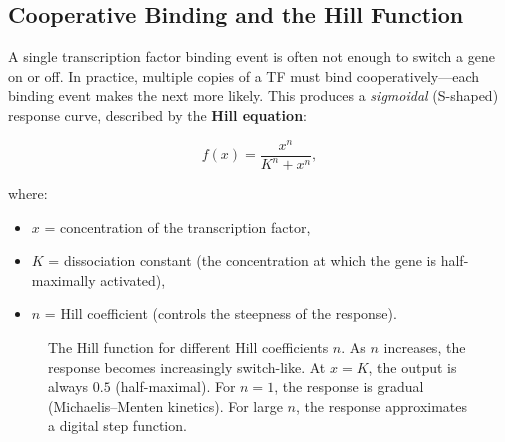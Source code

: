\subsection{Cooperative Binding and the Hill Function}
\label{subsec:hill-function}

A single transcription factor binding event is often not enough to switch a gene on or off. In practice, multiple copies of a TF must bind cooperatively---each binding event makes the next more likely. This produces a \emph{sigmoidal} (S-shaped) response curve, described by the \textbf{Hill equation}:

\begin{equation}
f(x) = \frac{x^n}{K^n + x^n},
\label{eq:hill-equation}
\end{equation}

where:
\begin{itemize}[leftmargin=1.8em]
  \item $x$ = concentration of the transcription factor,
  \item $K$ = dissociation constant (the concentration at which the gene is half-maximally activated),
  \item $n$ = Hill coefficient (controls the steepness of the response).
\end{itemize}

\begin{figure}[H]
\centering
{}
\caption{The Hill function for different Hill coefficients $n$. As $n$ increases, the response becomes increasingly switch-like. At $x=K$, the output is always $0.5$ (half-maximal). For $n=1$, the response is gradual (Michaelis--Menten kinetics). For large $n$, the response approximates a digital step function.}
\label{fig:hill-function}
\end{figure}

